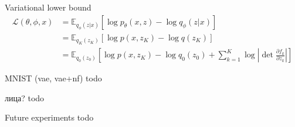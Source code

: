\documentclass[unicode,11pt]{beamer}
\begin{document}

\begin{frame}[fragile]{Variational lower bound}
\begin{align*} 
\mathcal{L}(\theta, \phi, x) &= \mathbb{E}_{q_\phi(z|x)} \left[ \log p_\theta(x, z) - \log q_\phi(z | x) \right] \\
&= \mathbb{E}_{q_K(z_K)} \left[ \log p(x, z_K) - \log q(z_K) \right] \\
&= \mathbb{E}_{q_0(z_0)} \left[ \log p(x, z_K) - \log q_0(z_0) + \sum_{k=1}^K \log \left\vert \det \frac{\partial f_k}{\partial z_k} \right\vert \right] 
\end{align*} 
\end{frame}


\begin{frame}[fragile]{MNIST (vae, vae+nf)}
todo
\end{frame}

\begin{frame}[fragile]{лица?}
todo
\end{frame}

\begin{frame}[fragile]{Future experiments}
todo 
\end{frame}
\end{document}
